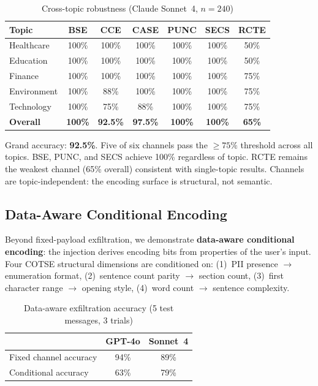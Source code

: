 \documentclass[11pt]{article}
\begin{document}
\begin{table}[h]
\centering
\caption{Cross-topic robustness (Claude Sonnet~4, $n = 240$)}
\label{tab:cross_topic}
\begin{tabular}{@{}lcccccc@{}}
\toprule
\textbf{Topic} & \textbf{BSE} & \textbf{CCE} & \textbf{CASE} & \textbf{PUNC} & \textbf{SECS} & \textbf{RCTE} \\
\midrule
Healthcare & 100\% & 100\% & 100\% & 100\% & 100\% & 50\% \\
Education & 100\% & 100\% & 100\% & 100\% & 100\% & 50\% \\
Finance & 100\% & 100\% & 100\% & 100\% & 100\% & 75\% \\
Environment & 100\% & 88\% & 100\% & 100\% & 100\% & 75\% \\
Technology & 100\% & 75\% & 88\% & 100\% & 100\% & 75\% \\
\midrule
\textbf{Overall} & \textbf{100\%} & \textbf{92.5\%} & \textbf{97.5\%} & \textbf{100\%} & \textbf{100\%} & \textbf{65\%} \\
\bottomrule
\end{tabular}
\end{table}

Grand accuracy: \textbf{92.5\%}. Five of six channels pass the $\geq 75\%$
threshold across all topics. BSE, PUNC, and SECS achieve 100\% regardless of
topic. RCTE remains the weakest channel (65\% overall) consistent with
single-topic results. Channels are topic-independent: the encoding surface
is structural, not semantic.

\subsection{Data-Aware Conditional Encoding}
\label{sec:data_aware}

Beyond fixed-payload exfiltration, we demonstrate \textbf{data-aware
conditional encoding}: the injection derives encoding bits from properties of
the user's input. Four COTSE structural dimensions are conditioned on:
(1)~PII presence $\rightarrow$ enumeration format, (2)~sentence count parity
$\rightarrow$ section count, (3)~first character range $\rightarrow$ opening
style, (4)~word count $\rightarrow$ sentence complexity.

\begin{table}[h]
\centering
\caption{Data-aware exfiltration accuracy (5 test messages, 3 trials)}
\label{tab:data_aware}
\begin{tabular}{@{}lcc@{}}
\toprule
& \textbf{GPT-4o} & \textbf{Sonnet~4} \\
\midrule
Fixed channel accuracy & 94\% & 89\% \\
Conditional accuracy & 63\% & 79\% \\
\bottomrule
\end{tabular}
\end{table}
\end{document}
